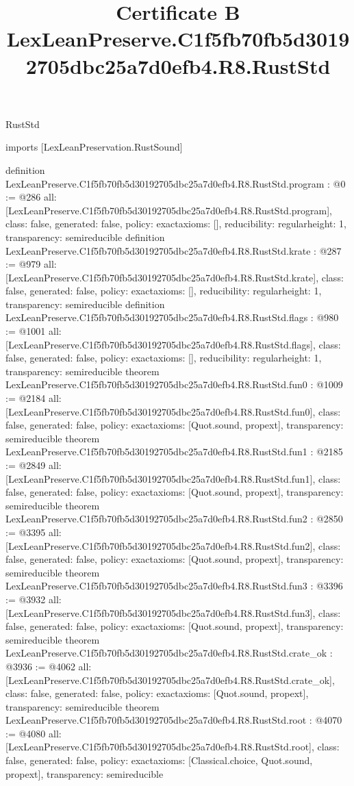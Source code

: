 \begin{lexlean}{RustStd}
\title{Certificate B LexLeanPreserve.C1f5fb70fb5d30192705dbc25a7d0efb4.R8.RustStd}
\begin{coremodule}
imports [LexLeanPreservation.RustSound]

definition LexLeanPreserve.C1f5fb70fb5d30192705dbc25a7d0efb4.R8.RustStd.program : @0 := @286 {
  all: [LexLeanPreserve.C1f5fb70fb5d30192705dbc25a7d0efb4.R8.RustStd.program],
  class: false,
  generated: false,
  policy: exact{axioms: []},
  reducibility: regular{height: 1},
  transparency: semireducible
}
definition LexLeanPreserve.C1f5fb70fb5d30192705dbc25a7d0efb4.R8.RustStd.krate : @287 := @979 {
  all: [LexLeanPreserve.C1f5fb70fb5d30192705dbc25a7d0efb4.R8.RustStd.krate],
  class: false,
  generated: false,
  policy: exact{axioms: []},
  reducibility: regular{height: 1},
  transparency: semireducible
}
definition LexLeanPreserve.C1f5fb70fb5d30192705dbc25a7d0efb4.R8.RustStd.flags : @980 := @1001 {
  all: [LexLeanPreserve.C1f5fb70fb5d30192705dbc25a7d0efb4.R8.RustStd.flags],
  class: false,
  generated: false,
  policy: exact{axioms: []},
  reducibility: regular{height: 1},
  transparency: semireducible
}
theorem LexLeanPreserve.C1f5fb70fb5d30192705dbc25a7d0efb4.R8.RustStd.fun0 : @1009 := @2184 {
  all: [LexLeanPreserve.C1f5fb70fb5d30192705dbc25a7d0efb4.R8.RustStd.fun0],
  class: false,
  generated: false,
  policy: exact{axioms: [Quot.sound, propext]},
  transparency: semireducible
}
theorem LexLeanPreserve.C1f5fb70fb5d30192705dbc25a7d0efb4.R8.RustStd.fun1 : @2185 := @2849 {
  all: [LexLeanPreserve.C1f5fb70fb5d30192705dbc25a7d0efb4.R8.RustStd.fun1],
  class: false,
  generated: false,
  policy: exact{axioms: [Quot.sound, propext]},
  transparency: semireducible
}
theorem LexLeanPreserve.C1f5fb70fb5d30192705dbc25a7d0efb4.R8.RustStd.fun2 : @2850 := @3395 {
  all: [LexLeanPreserve.C1f5fb70fb5d30192705dbc25a7d0efb4.R8.RustStd.fun2],
  class: false,
  generated: false,
  policy: exact{axioms: [Quot.sound, propext]},
  transparency: semireducible
}
theorem LexLeanPreserve.C1f5fb70fb5d30192705dbc25a7d0efb4.R8.RustStd.fun3 : @3396 := @3932 {
  all: [LexLeanPreserve.C1f5fb70fb5d30192705dbc25a7d0efb4.R8.RustStd.fun3],
  class: false,
  generated: false,
  policy: exact{axioms: [Quot.sound, propext]},
  transparency: semireducible
}
theorem LexLeanPreserve.C1f5fb70fb5d30192705dbc25a7d0efb4.R8.RustStd.crate_ok : @3936 := @4062 {
  all: [LexLeanPreserve.C1f5fb70fb5d30192705dbc25a7d0efb4.R8.RustStd.crate_ok],
  class: false,
  generated: false,
  policy: exact{axioms: [Quot.sound, propext]},
  transparency: semireducible
}
theorem LexLeanPreserve.C1f5fb70fb5d30192705dbc25a7d0efb4.R8.RustStd.root : @4070 := @4080 {
  all: [LexLeanPreserve.C1f5fb70fb5d30192705dbc25a7d0efb4.R8.RustStd.root],
  class: false,
  generated: false,
  policy: exact{axioms: [Classical.choice, Quot.sound, propext]},
  transparency: semireducible
}


\end{coremodule}
\end{lexlean}
